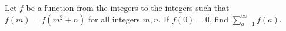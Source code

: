 Let $f$ be a function from the integers to the integers such that $f(m)=f(m^2+n)$ for all integers $m,n$. If $f(0)=0$, find $\displaystyle\sum_{a=1}^{\infty}f(a)$.
